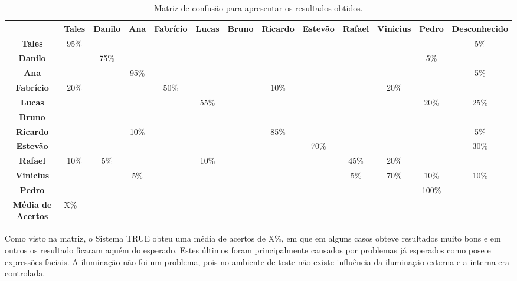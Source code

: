 	\begin{landscape}
	\begin{table}[htb]
		\begin{center}
			\caption{Matriz de confusão para apresentar os resultados obtidos.}
			\label{tab:matriz-confusao}
			\begin{tabular}{|c|c|c|c|c|c|c|c|c|c|c|c|c|}
				\hline  & \bf Tales & \bf Danilo & \bf Ana & \bf Fabrício & \bf Lucas & \bf Bruno & \bf Ricardo & \bf Estevão & \bf Rafael & \bf Vinicius & \bf Pedro & \bf Desconhecido\\
				\hline \bf Tales 		& 95\% & 			& 		 & 			& & & 		 & & 		 & 			& 		 & 5\%\\
				\hline \bf Danilo 	& 		 & 75\% & 		 & 			& & & 		 & & 		 & 			& 5\%  &		\\
				\hline \bf Ana 			& 		 & 			& 95\% & 			& & & 		 & & 		 & 			& 		 & 5\%\\
				\hline \bf Fabrício & 20\% & 			& 		 & 50\% & & & 10\% & & 		 & 20\% & 		 &		\\
				\hline \bf Lucas 		& 		 & 			& 		 & 			& 55\% & & 		 & & 		 & 			& 	20\%	 &	25\%	\\
				\hline \bf Bruno 		& 		 & 			& 		 & 			& & & 		 & & 		 & 			& 		 &		\\
				\hline \bf Ricardo 	& 		 & 			& 10\% & 			& & & 85\% & & 		 & 			& 		 & 5\%\\
				\hline \bf Estevão 	& 		 & 			& 		 & 			& & & 		 & 70\% & 		 & 			& 		 & 30\%\\
				\hline \bf Rafael 	& 10\% & 	5\%	& 		 & 			& 10\% & & 		 & & 	45\%	 & 	20\%	& 		 &		\\
				\hline \bf Vinicius & 		 & 			& 5\%  & 			& & & 		 & & 5\% & 70\% & 10\% & 10\%\\
				\hline \bf Pedro 		& 		 & 			& 		 & 			& & & 		 & & 		 & 			& 	100\%	 &		\\
				\hline
				\hline \bf Média de Acertos & \multicolumn{12}{|l|}{X\%} \\
				\hline
			\end{tabular}
		\end{center}
	\end{table}
	\end{landscape}

	Como visto na matriz, o Sistema TRUE obteu uma média de acertos de X\%, em que em alguns casos obteve resultados muito bons e em outros os resultado ficaram aquém do esperado. Estes últimos foram principalmente causados por problemas já esperados como pose e expressões faciais. A iluminação não foi um problema, pois no ambiente de teste não existe influência da iluminação externa e a interna era controlada.
